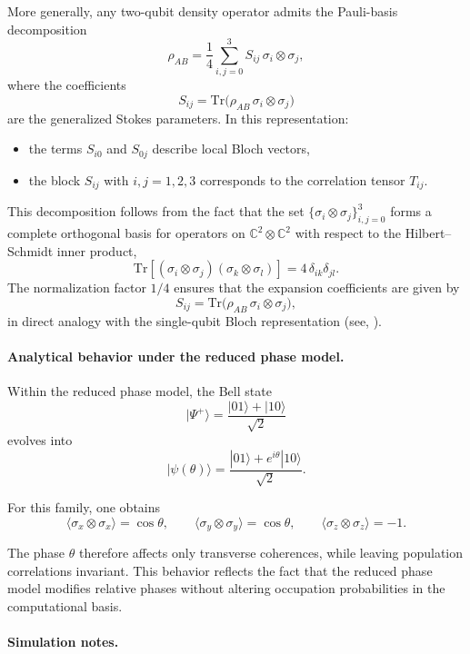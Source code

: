 \documentclass[a4paper]{article}
\begin{document}
\medskip

More generally, any two-qubit density operator admits the Pauli-basis decomposition
\[
\rho_{AB}
=
\frac{1}{4}
\sum_{i,j=0}^{3}
S_{ij}\, \sigma_i \otimes \sigma_j,
\]
where the coefficients
\[
S_{ij} = \mathrm{Tr}\bigl(\rho_{AB}\, \sigma_i \otimes \sigma_j\bigr)
\]
are the generalized Stokes parameters. In this representation:
\begin{itemize}
    \item the terms \(S_{i0}\) and \(S_{0j}\) describe local Bloch vectors,
    \item the block \(S_{ij}\) with \(i,j=1,2,3\) corresponds to the correlation tensor \(T_{ij}\).
\end{itemize}

This decomposition follows from the fact that the set \(\{\sigma_i \otimes \sigma_j\}_{i,j=0}^3\) forms a complete orthogonal basis for operators on \(\mathbb{C}^2 \otimes \mathbb{C}^2\) with respect to the Hilbert--Schmidt inner product,
\[
\mathrm{Tr}\!\left[(\sigma_i \otimes \sigma_j)(\sigma_k \otimes \sigma_l)\right]
=
4\,\delta_{ik}\delta_{jl}.
\]
The normalization factor \(1/4\) ensures that the expansion coefficients are given by
\[
S_{ij} = \mathrm{Tr}\bigl(\rho_{AB}\, \sigma_i \otimes \sigma_j\bigr),
\]
in direct analogy with the single-qubit Bloch representation (see, \cite{James2001}).
\medskip

\paragraph{Analytical behavior under the reduced phase model.}

Within the reduced phase model, the Bell state
\[
|\Psi^+\rangle = \frac{|01\rangle + |10\rangle}{\sqrt{2}}
\]
evolves into
\[
|\psi(\theta)\rangle
=
\frac{|01\rangle + e^{i\theta}|10\rangle}{\sqrt{2}}.
\]

For this family, one obtains
\[
\langle \sigma_x \otimes \sigma_x \rangle = \cos\theta,
\qquad
\langle \sigma_y \otimes \sigma_y \rangle = \cos\theta,
\qquad
\langle \sigma_z \otimes \sigma_z \rangle = -1.
\]

The phase \(\theta\) therefore affects only transverse coherences, while leaving population correlations invariant. This behavior reflects the fact that the reduced phase model modifies relative phases without altering occupation probabilities in the computational basis.

\paragraph{Simulation notes.}
\end{document}
